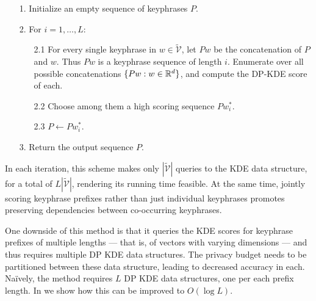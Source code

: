 

\begin{enumerate}
 \item[1.] Initialize an empty sequence of keyphrases $P$.
 \item[2.] For $i=1,\ldots,L:$
 \begin{enumerate}
 \item[2.1] For every single keyphrase in $w\in\widetilde{\mathcal{V}}$, let $Pw$ be the concatenation of $P$ and $w$. Thus $Pw$ is a keyphrase sequence of length $i$. Enumerate over all possible concatenations $\{Pw:w\in\mathbb R^d\}$, and compute the DP-KDE score of each.
 \item[2.2] Choose among them a high scoring sequence $Pw^*_i$. %
 \item[2.3] $P\leftarrow Pw^*_i$.
 \end{enumerate}
 \item[3.] Return the output sequence $P$.
\end{enumerate}
In each iteration, this scheme makes only $|\widetilde{\mathcal{V}}|$ queries to the KDE data structure, for a total of $L|\widetilde{\mathcal{V}}|$, rendering its running time feasible. At the same time, jointly scoring keyphrase prefixes rather than just individual keyphrases promotes preserving dependencies between co-occurring keyphrases. 

One downside of this method is that it queries the KDE scores for keyphrase prefixes of multiple lengths --- that is, of vectors with varying dimensions --- and thus requires multiple DP KDE data structures. The privacy budget needs to be partitioned between these data structure, leading to decreased accuracy in each. Na\"ively, the method requires $L$ DP KDE data structures, one per each prefix length. In  we show how this can be improved to $O(\log L)$. 



